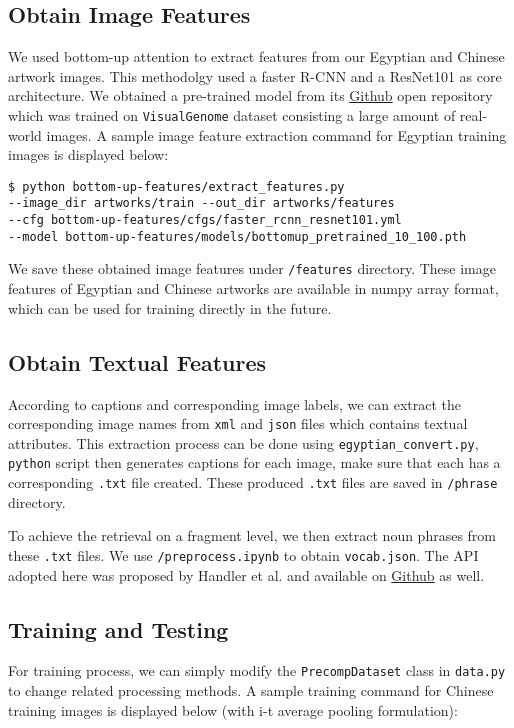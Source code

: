 \subsection{Obtain Image Features}
We used bottom-up attention \cite{bottomup} to extract features from our Egyptian and Chinese artwork images. This methodolgy used a faster R-CNN and a ResNet101 as core architecture. We obtained a pre-trained model from its \href{https://github.com/peteanderson80/bottom-up-attention}{Github} open repository which was trained on \verb|VisualGenome| dataset consisting a large amount of real-world images. A sample image feature extraction command for Egyptian training images is displayed below:

\begin{lstlisting}
$ python bottom-up-features/extract_features.py 
--image_dir artworks/train --out_dir artworks/features 
--cfg bottom-up-features/cfgs/faster_rcnn_resnet101.yml 
--model bottom-up-features/models/bottomup_pretrained_10_100.pth
\end{lstlisting}

We save these obtained image features under \verb|/features| directory. These image features of Egyptian and Chinese artworks are available in numpy array format, which can be used for training directly in the future.

\subsection{Obtain Textual Features}

According to captions and corresponding image labels, we can extract the corresponding image names from \verb|xml| and \verb|json| files which contains textual attributes. This extraction process can be done using \verb|egyptian_convert.py|, \verb|python| script then generates captions for each image, make sure that each has a corresponding \verb|.txt| file created. These produced \verb|.txt| files are saved in \verb|/phrase| directory. 

To achieve the retrieval on a fragment level, we then extract noun phrases from these \verb|.txt| files. We use \verb|/preprocess.ipynb| to obtain \verb|vocab.json|. The API adopted here was proposed by Handler et al. \cite{nounphrase} and available on \href{https://github.com/slanglab/phrasemachine}{Github} as well.

\subsection{Training and Testing}
For training process, we can simply modify the \verb|PrecompDataset| class in \verb|data.py| to change related processing methods. A sample training command for Chinese training images is displayed below (with i-t average pooling formulation):

